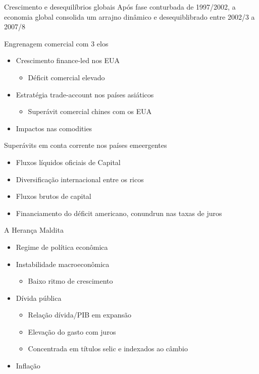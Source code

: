 \documentclass[presentation]{beamer}
\begin{document}
\begin{frame}[label={sec:org86baf7b}]{Crescimento e desequilíbrios globais}
Após fase conturbada de 1997/2002, a economia global consolida um arrajno dinâmico e desequiblibrado entre 2002/3 a 2007/8

\alert{Engrenagem comercial com 3 elos}
\begin{itemize}
\item Crescimento finance-led nos EUA
\begin{itemize}
\item Déficit comercial elevado
\end{itemize}
\item Estratégia trade-account nos países asiáticos
\begin{itemize}
\item Superávit comercial chines com os EUA
\end{itemize}
\item Impactos nas comodities
\end{itemize}

\alert{Superávits em conta corrente nos países emeergentes}
\begin{itemize}
\item Fluxos líquidos oficiais de Capital
\item Diversificação internacional entre os ricos
\item Fluxos brutos de capital
\item Financiamento do déficit americano, conundrun nas taxas de juros
\end{itemize}
\end{frame}

\begin{frame}[label={sec:orge8297c7}]{A Herança Maldita}
\begin{itemize}
\item Regime de política econômica
\item Instabilidade macroeconômica
\begin{itemize}
\item Baixo ritmo de crescimento
\end{itemize}
\item Dívida pública
\begin{itemize}
\item Relação dívida/PIB em expansão
\item Elevação do gasto com juros
\item Concentrada em títulos selic e indexados ao câmbio
\end{itemize}
\item Inflação
\end{itemize}
\end{frame}
\end{document}
